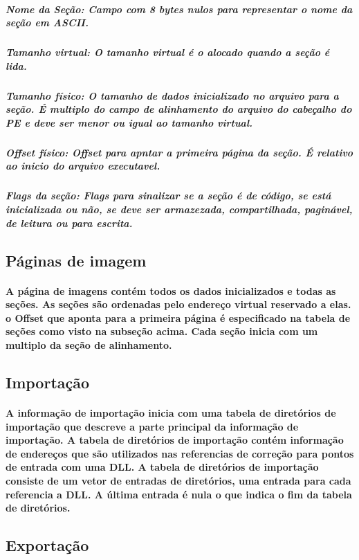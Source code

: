 \subparagraph*{Nome da Seção: Campo com 8 bytes nulos para representar o nome da
seção em ASCII.}


\subparagraph*{Tamanho virtual: O tamanho virtual é o alocado quando a seção é lida.}


\subparagraph*{Tamanho físico: O tamanho de dados inicializado no arquivo para a
seção. É multiplo do campo de alinhamento do arquivo do cabeçalho
do PE e deve ser menor ou igual ao tamanho virtual.}


\subparagraph*{Offset físico: Offset para apntar a primeira página da seção. É relativo
ao inicio do arquivo executavel.}


\subparagraph*{Flags da seção: Flags para sinalizar se a seção é de código, se está
inicializada ou não, se deve ser armazezada, compartilhada, paginável,
de leitura ou para escrita.}


\subsection{Páginas de imagem}


\paragraph{A página de imagens contém todos os dados inicializados e todas as
seções. As seções são ordenadas pelo endereço virtual reservado a
elas. o Offset que aponta para a primeira página é especificado na
tabela de seções como visto na subseção acima. Cada seção inicia com
um multiplo da seção de alinhamento.}


\subsection{Importação}


\paragraph{A informação de importação inicia com uma tabela de diretórios de
importação que descreve a parte principal da informação de importação.
A tabela de diretórios de importação contém informação de endereços
que são utilizados nas referencias de correção para pontos de entrada
com uma DLL. A tabela de diretórios de importação consiste de um vetor
de entradas de diretórios, uma entrada para cada referencia a DLL.
A última entrada é nula o que indica o fim da tabela de diretórios.}


\subsection{Exportação}


